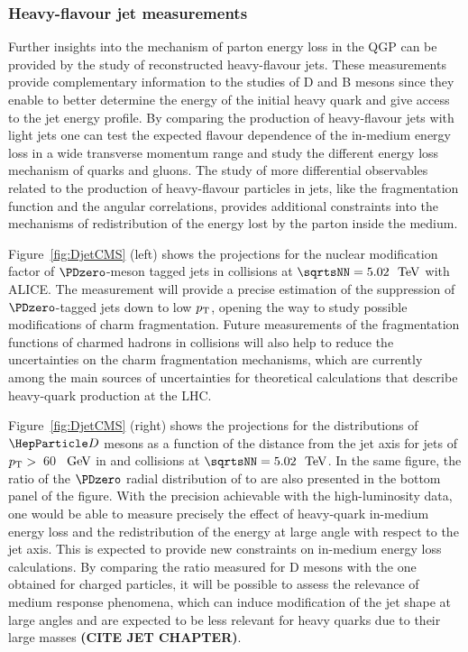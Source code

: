 \subsubsection{Heavy-flavour jet measurements}
Further insights into the mechanism of parton energy loss in the QGP can be provided by the study of reconstructed heavy-flavour jets. These measurements provide complementary information to the studies of D and B mesons since they enable to better determine the energy of the initial heavy quark and give access to the jet energy profile. By comparing the production of heavy-flavour jets with light jets one can test the expected flavour dependence of the in-medium energy loss in a wide transverse momentum range and study the different energy loss mechanism of quarks and gluons. The study of more differential observables related to the production of heavy-flavour particles in jets, like the fragmentation function and the angular correlations, provides additional constraints into the mechanisms of redistribution of the energy lost by the parton inside the medium. %


Figure~\ref{fig:DjetCMS} (left) shows the projections for the nuclear modification factor of $\PDzero$-meson tagged jets in \PbPb collisions at $\sqrtsNN=5.02~{\UTeV}$ with ALICE. The measurement will provide a precise estimation of the suppression of $\PDzero$-tagged jets down to low $p\sb{\scriptstyle\mathrm{T}}$, opening the way to study possible modifications of charm fragmentation. Future measurements of the fragmentation functions of charmed hadrons in \pp collisions will also help to reduce the uncertainties on the charm fragmentation mechanisms, which are currently among the main sources of uncertainties for theoretical calculations that describe heavy-quark production at the LHC. 

Figure~\ref{fig:DjetCMS} (right) shows the projections for the distributions of $\PD$ mesons as a function of the distance from the jet axis for jets of $p\sb{\scriptstyle\mathrm{T}}>$~60~$~\text{GeV}$ in \pp and \PbPb collisions at $\sqrtsNN=5.02~{\UTeV}$. In the same figure, the ratio of the $\PDzero$ radial distribution of \PbPb to \pp are also presented in the bottom panel of the figure. With the precision achievable with the high-luminosity data, one would be able to measure precisely the effect of heavy-quark in-medium energy loss and the redistribution of the energy at large angle with respect to the jet axis. This is expected to provide new constraints on in-medium energy loss calculations. By comparing the ratio measured for D mesons with the one obtained for charged particles, it will be possible to assess the relevance of medium response phenomena, which can induce modification of the jet shape at large angles and are expected to be less relevant for heavy quarks due to their large masses \textbf{(CITE JET CHAPTER)}.

